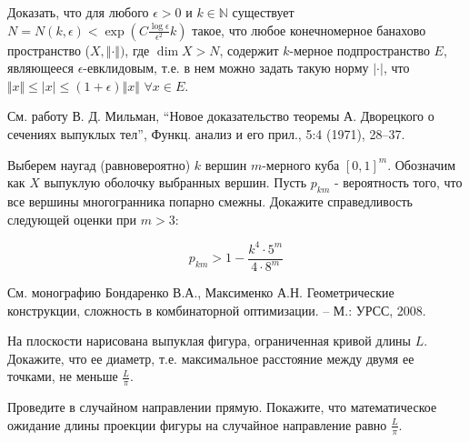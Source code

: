 \begin{problem}
\label{sec:dvor}
Доказать, что для любого $\epsilon > 0$ и $k \in \mathbb{N}$
существует $N = N(k, \epsilon) < \exp(C\frac{\log \epsilon}{\epsilon^2}k)$ такое, что любое конечномерное банахово пространство ($X, \Vert\cdot\Vert)$, где $\dim X > N$, содержит $k$-мерное подпространство $E$, являющееся $\epsilon$-евклидовым, т.е. в нем можно задать такую норму $\vert \cdot \vert$, что $\Vert x \Vert \leqslant \vert x \vert \leqslant (1 + \epsilon) \Vert x \Vert$ $\forall x \in E$.     

\begin{remark} См. работу В. Д. Мильман, “Новое доказательство теоремы А. Дворецкого о сечениях выпуклых тел”, Функц. анализ и его прил., 5:4 (1971), 28–37. 

\end{remark}

\begin{comment}
НАЗАР, СЮДА СТОИТ ВСТАВИТЬ ЗАМЕЧАНИЕ ИЗ СТАТЬИ GOWERS'а
И ДОБАВИТЬ В ВИДЕ ЗАДАЧИ ТЕОРЕМУ Б.С, Кашина - см. статью того же Gowers'a и ссылки в том моем письме
\end{comment}


\end{problem}

\begin{problem}
Выберем наугад (равновероятно) $k$ вершин $m$-мерного куба $[0,1]^m$. Обозначим как $X$ выпуклую оболочку выбранных вершин. Пусть $p_{km}$ - вероятность того, что все вершины многогранника попарно смежны. Докажите справедливость следующей оценки при $m > 3$:

\[
p_{km} > 1 - \frac{k^4 \cdot 5^m}{4 \cdot 8^m}
\]
    
\end{problem}
\begin{remark}
См. монографию Бондаренко В.А., Максименко А.Н. Геометрические конструкции, сложность в комбинаторной оптимизации. -- М.: УРСС, 2008.
\end{remark}


\begin{problem}
На плоскости нарисована выпуклая фигура, ограниченная кривой длины $L$. Докажите, что ее диаметр, т.е. максимальное расстояние между двумя ее точками, не меньше $\frac{L}{\pi }$.
\end{problem}
\begin{ordre}
Проведите в случайном направлении прямую. Покажите, что 
математическое ожидание длины проекции фигуры на случайное направление равно 
$\frac{L}{\pi }$.
\end{ordre}

